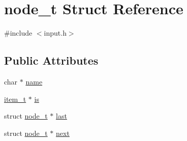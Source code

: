 \hypertarget{structnode__t}{\section{node\-\_\-t Struct Reference}
\label{structnode__t}
}


{\ttfamily \#include $<$input.\-h$>$}

\subsection*{Public Attributes}
\begin{DoxyCompactItemize}
\item 
char $\ast$ \hyperlink{structnode__t_a84f8212d7d9b2f1e6aa5b44889685fdf}{name}
\item 
\hyperlink{structitem__t}{item\-\_\-t} $\ast$ \hyperlink{structnode__t_a382fa3f6173e83140aaa7b03d23676d9}{is}
\item 
struct \hyperlink{structnode__t}{node\-\_\-t} $\ast$ \hyperlink{structnode__t_a899e09e88ee2875bcb67c83fcf1f5510}{last}
\item 
struct \hyperlink{structnode__t}{node\-\_\-t} $\ast$ \hyperlink{structnode__t_a8d56a134e4eebf92f303fb09f89dc73e}{next}
\end{DoxyCompactItemize}


